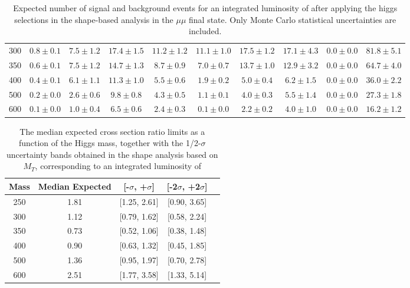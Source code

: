 \begin{table}
{\begin{center}
\begin{tabular}{l | c c |  c c c c c c c }
300 & $0.8\pm0.1$ & $7.5\pm1.2$ & $17.4\pm1.5$ & $11.2\pm1.2$ & $11.1\pm1.0$ & $17.5\pm1.2$ & $17.1\pm4.3$ & $0.0\pm0.0$ & $81.8\pm5.1$ \\ %
350 & $0.6\pm0.1$ & $7.5\pm1.2$ & $14.7\pm1.3$ & $8.7\pm0.9$ & $7.0\pm0.7$ & $13.7\pm1.0$ & $12.9\pm3.2$ & $0.0\pm0.0$ & $64.7\pm4.0$ \\ %
400 & $0.4\pm0.1$ & $6.1\pm1.1$ & $11.3\pm1.0$ & $5.5\pm0.6$ & $1.9\pm0.2$ & $5.0\pm0.4$ & $6.2\pm1.5$ & $0.0\pm0.0$ & $36.0\pm2.2$ \\ %
500 & $0.2\pm0.0$ & $2.6\pm0.6$ & $9.8\pm0.8$ & $4.3\pm0.5$ & $1.1\pm0.1$ & $4.0\pm0.3$ & $5.5\pm1.4$ & $0.0\pm0.0$ & $27.3\pm1.8$ \\ %
600 & $0.1\pm0.0$ & $1.0\pm0.4$ & $6.5\pm0.6$ & $2.4\pm0.3$ & $0.1\pm0.0$ & $2.2\pm0.2$ & $4.0\pm1.0$ & $0.0\pm0.0$ & $16.2\pm1.2$ \\ %
\hline
\end{tabular}
\end{center}
}
\caption{Expected number of signal and background events for an 
  integrated luminosity of \intlumi after applying the higgs selections in the shape-based analysis in the $\mu\mu$ final state. 
  Only Monte Carlo statistical uncertainties are included. }
\label{tab:yield_shapebased_mm}
\end{table}

\begin{table}
\begin{center}
\begin{tabular}{ccccc}
\hline
 Mass & Median Expected & [-$\sigma$, +$\sigma$] & [-2$\sigma$, +2$\sigma$]\\\hline
 250 & 1.81 & [1.25, 2.61] & [0.90, 3.65] \\
300 & 1.12 & [0.79, 1.62] & [0.58, 2.24] \\
350 & 0.73 & [0.52, 1.06] & [0.38, 1.48] \\
400 & 0.90 & [0.63, 1.32] & [0.45, 1.85] \\
500 & 1.36 & [0.95, 1.97] & [0.70, 2.78] \\
600 & 2.51 & [1.77, 3.58] & [1.33, 5.14] \\
\hline
\end{tabular}
\end{center}
\label{tab:limits_mtshape_2fb}
\caption{\fixme The median expected cross section ratio limits as a function 
of the Higgs mass, together with the 1/2-$\sigma$ uncertainty bands obtained in the shape analysis based on $M_T$, corresponding to 
an integrated luminosity of \intlumi}
\end{table}